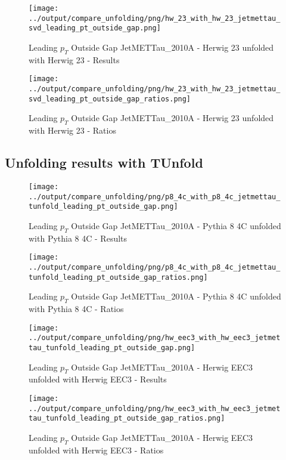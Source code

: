 \documentclass[11pt]{book}
\begin{document}
\begin{figure}[ht]
\centering
\texttt{[image: ../output/compare\_unfolding/png/hw\_23\_with\_hw\_23\_jetmettau\_svd\_leading\_pt\_outside\_gap.png]}
\caption{Leading $p_{T}$ Outside Gap JetMETTau\_2010A - Herwig 23 unfolded with Herwig 23 - Results}
\label{hw_23_hw_23_jetmettau_svd_leading_pt_outside_gap_a}
\end{figure}

\begin{figure}[ht]
\centering
\texttt{[image: ../output/compare\_unfolding/png/hw\_23\_with\_hw\_23\_jetmettau\_svd\_leading\_pt\_outside\_gap\_ratios.png]}
\caption{Leading $p_{T}$ Outside Gap JetMETTau\_2010A - Herwig 23 unfolded with Herwig 23 - Ratios}
\label{hw_23_hw_23_jetmettau_svd_leading_pt_outside_gap_b}
\end{figure}


\clearpage
\subsection{Unfolding results with TUnfold}

\begin{figure}[ht]
\centering
\texttt{[image: ../output/compare\_unfolding/png/p8\_4c\_with\_p8\_4c\_jetmettau\_tunfold\_leading\_pt\_outside\_gap.png]}
\caption{Leading $p_{T}$ Outside Gap JetMETTau\_2010A - Pythia 8 4C unfolded with Pythia 8 4C - Results}
\label{p8_p8_jetmettau_tunfold_leading_pt_outside_gap_a}
\end{figure}

\begin{figure}[ht]
\centering
\texttt{[image: ../output/compare\_unfolding/png/p8\_4c\_with\_p8\_4c\_jetmettau\_tunfold\_leading\_pt\_outside\_gap\_ratios.png]}
\caption{Leading $p_{T}$ Outside Gap JetMETTau\_2010A - Pythia 8 4C unfolded with Pythia 8 4C - Ratios}
\label{p8_p8_jetmettau_tunfold_leading_pt_outside_gap_b}
\end{figure}

\begin{figure}[ht]
\centering
\texttt{[image: ../output/compare\_unfolding/png/hw\_eec3\_with\_hw\_eec3\_jetmettau\_tunfold\_leading\_pt\_outside\_gap.png]}
\caption{Leading $p_{T}$ Outside Gap JetMETTau\_2010A - Herwig EEC3 unfolded with Herwig EEC3 - Results}
\label{hw_eec3_hw_eec3_jetmettau_tunfold_leading_pt_outside_gap_a}
\end{figure}

\begin{figure}[ht]
\centering
\texttt{[image: ../output/compare\_unfolding/png/hw\_eec3\_with\_hw\_eec3\_jetmettau\_tunfold\_leading\_pt\_outside\_gap\_ratios.png]}
\caption{Leading $p_{T}$ Outside Gap JetMETTau\_2010A - Herwig EEC3 unfolded with Herwig EEC3 - Ratios}
\label{hw_eec3_hw_eec3_jetmettau_tunfold_leading_pt_outside_gap_b}
\end{figure}
\end{document}
